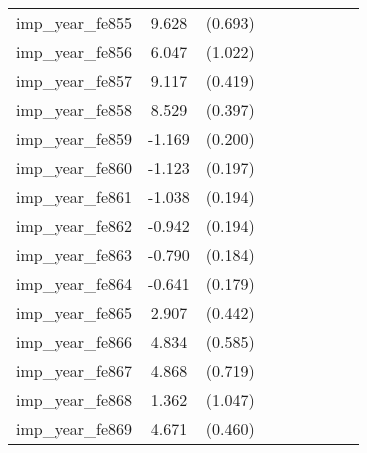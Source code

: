 {\begin{tabular}{l*{4}{cc}}
imp\_year\_fe855&    9.628\sym{***}&  (0.693)&                  &         &                  &         &                  &         \\
imp\_year\_fe856&    6.047\sym{***}&  (1.022)&                  &         &                  &         &                  &         \\
imp\_year\_fe857&    9.117\sym{***}&  (0.419)&                  &         &                  &         &                  &         \\
imp\_year\_fe858&    8.529\sym{***}&  (0.397)&                  &         &                  &         &                  &         \\
imp\_year\_fe859&   -1.169\sym{***}&  (0.200)&                  &         &                  &         &                  &         \\
imp\_year\_fe860&   -1.123\sym{***}&  (0.197)&                  &         &                  &         &                  &         \\
imp\_year\_fe861&   -1.038\sym{***}&  (0.194)&                  &         &                  &         &                  &         \\
imp\_year\_fe862&   -0.942\sym{***}&  (0.194)&                  &         &                  &         &                  &         \\
imp\_year\_fe863&   -0.790\sym{***}&  (0.184)&                  &         &                  &         &                  &         \\
imp\_year\_fe864&   -0.641\sym{***}&  (0.179)&                  &         &                  &         &                  &         \\
imp\_year\_fe865&    2.907\sym{***}&  (0.442)&                  &         &                  &         &                  &         \\
imp\_year\_fe866&    4.834\sym{***}&  (0.585)&                  &         &                  &         &                  &         \\
imp\_year\_fe867&    4.868\sym{***}&  (0.719)&                  &         &                  &         &                  &         \\
imp\_year\_fe868&    1.362         &  (1.047)&                  &         &                  &         &                  &         \\
imp\_year\_fe869&    4.671\sym{***}&  (0.460)&                  &         &                  &         &                  &         \\

\end{tabular}}
